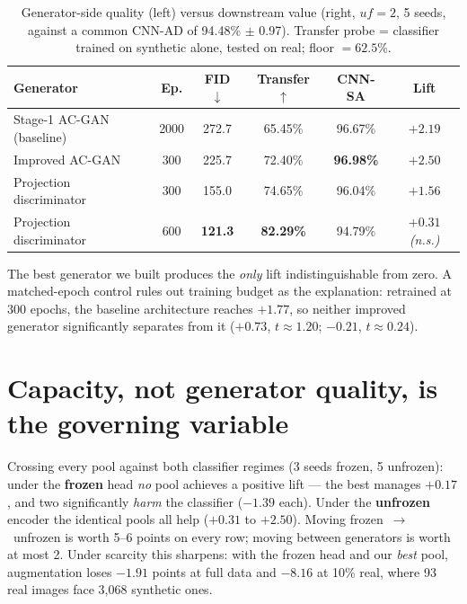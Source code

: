 \documentclass[10pt]{article}
\begin{document}
\begin{table}[htbp]\centering
\caption{Generator-side quality (left) versus downstream value (right, $uf{=}2$, 5 seeds, against a common
CNN-AD of 94.48\% $\pm$ 0.97). Transfer probe = classifier trained on synthetic alone, tested on real;
floor $=62.5\%$.}
\begin{tabular}{@{}lccccc@{}}
\toprule
\textbf{Generator} & \textbf{Ep.} & \textbf{FID $\downarrow$} & \textbf{Transfer $\uparrow$} & \textbf{CNN-SA} & \textbf{Lift} \\
\midrule
Stage-1 AC-GAN (baseline) & 2000 & 272.7 & 65.45\% & 96.67\% & $+2.19$ \\
Improved AC-GAN & 300 & 225.7 & 72.40\% & \textbf{96.98\%} & $\mathbf{+2.50}$ \\
Projection discriminator & 300 & 155.0 & 74.65\% & 96.04\% & $+1.56$ \\
Projection discriminator & 600 & \textbf{121.3} & \textbf{82.29\%} & 94.79\% & $+0.31$ \emph{(n.s.)} \\
\bottomrule
\end{tabular}
\end{table}

\noindent The best generator we built produces the \emph{only} lift indistinguishable from zero. A
matched-epoch control rules out training budget as the explanation: retrained at 300 epochs, the baseline
architecture reaches $+1.77$, so neither improved generator significantly separates from it
($+0.73$, $t\approx1.20$; $-0.21$, $t\approx0.24$).

\section*{Capacity, not generator quality, is the governing variable}
Crossing every pool against both classifier regimes (3 seeds frozen, 5 unfrozen): under the \textbf{frozen}
head \emph{no} pool achieves a positive lift --- the best manages $+0.17$, and two significantly
\emph{harm} the classifier ($-1.39$ each). Under the \textbf{unfrozen} encoder the identical pools all help
($+0.31$ to $+2.50$). Moving frozen~$\to$~unfrozen is worth 5--6 points on every row; moving between
generators is worth at most 2. Under scarcity this sharpens: with the frozen head and our \emph{best} pool,
augmentation loses $-1.91$ points at full data and $-8.16$ at 10\% real, where 93 real images face 3{,}068
synthetic ones.
\end{document}
